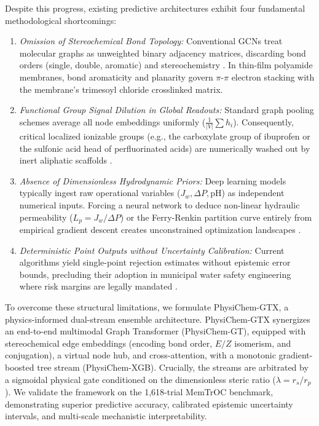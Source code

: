 \documentclass[11pt]{article}
\begin{document}
Despite this progress, existing predictive architectures exhibit four fundamental methodological shortcomings:
\begin{enumerate}[leftmargin=1.3em,itemsep=2pt,topsep=3pt]
\item \textit{Omission of Stereochemical Bond Topology:} Conventional GCNs treat molecular graphs as unweighted binary adjacency matrices, discarding bond orders (single, double, aromatic) and stereochemistry \cite{kipf2017,hu2020}. In thin-film polyamide membranes, bond aromaticity and planarity govern $\pi$-$\pi$ electron stacking with the membrane's trimesoyl chloride crosslinked matrix.
\item \textit{Functional Group Signal Dilution in Global Readouts:} Standard graph pooling schemes average all node embeddings uniformly ($\frac{1}{|V|}\sum h_i$). Consequently, critical localized ionizable groups (e.g., the carboxylate group of ibuprofen or the sulfonic acid head of perfluorinated acids) are numerically washed out by inert aliphatic scaffolds \cite{xu2019}.
\item \textit{Absence of Dimensionless Hydrodynamic Priors:} Deep learning models typically ingest raw operational variables ($J_w, \Delta P, \mathrm{pH}$) as independent numerical inputs. Forcing a neural network to deduce non-linear hydraulic permeability ($L_p = J_w/\Delta P$) or the Ferry-Renkin partition curve entirely from empirical gradient descent creates unconstrained optimization landscapes \cite{karniadakis2021}.
\item \textit{Deterministic Point Outputs without Uncertainty Calibration:} Current algorithms yield single-point rejection estimates without epistemic error bounds, precluding their adoption in municipal water safety engineering where risk margins are legally mandated \cite{gal2016}.
\end{enumerate}

To overcome these structural limitations, we formulate PhysiChem-GTX, a physics-informed dual-stream ensemble architecture. PhysiChem-GTX synergizes an end-to-end multimodal Graph Transformer (PhysiChem-GT), equipped with stereochemical edge embeddings (encoding bond order, $E/Z$ isomerism, and conjugation), a virtual node hub, and cross-attention, with a monotonic gradient-boosted tree stream (PhysiChem-XGB). Crucially, the streams are arbitrated by a sigmoidal physical gate conditioned on the dimensionless steric ratio ($\lambda = r_s/r_p$). We validate the framework on the 1,618-trial MemTrOC benchmark, demonstrating superior predictive accuracy, calibrated epistemic uncertainty intervals, and multi-scale mechanistic interpretability.
\end{document}
